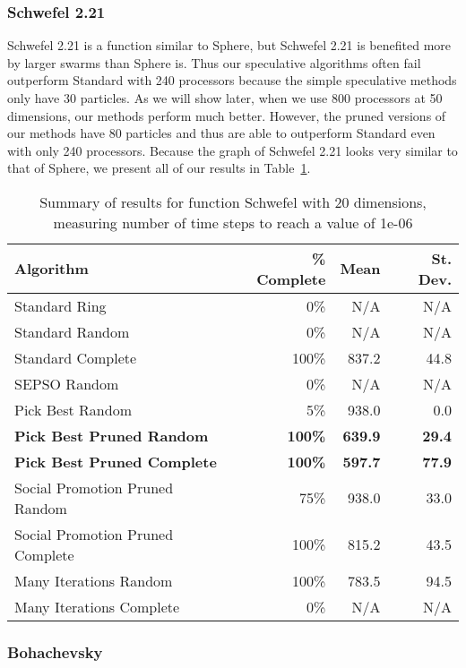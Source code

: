 \documentclass[smallcondensed]{svjour3}
\newcommand{\tabref}[1]{Table~\ref{tab:#1}}
\begin{document}
\subsubsection{Schwefel 2.21}

Schwefel 2.21 is a function similar to Sphere, but Schwefel 2.21 is benefited
more by larger swarms than Sphere is.  Thus our speculative algorithms often
fail outperform Standard with 240 processors because the simple speculative
methods only have 30 particles.  As we will show later, when we use 800
processors at 50 dimensions, our methods perform much better.  However, the
pruned versions of our methods have 80 particles and thus are able to
outperform Standard even with only 240 processors.  Because the graph of
Schwefel 2.21 looks very similar to that of Sphere, we present all of our
results in \tabref{schwefel-20}.

\begin{table}
  \caption{Summary of results for function Schwefel with 20 dimensions,
  measuring number of time steps to reach a value of 1e-06}
  \label{tab:schwefel-20}
  \centering
  \begin{tabular}{|l|r|r|r|}
  \hline
  Algorithm&\% Complete&Mean&St. Dev.\\
  \hline
  \hline
  Standard Ring&0\%&N/A&N/A\\
  \hline
  Standard Random&0\%&N/A&N/A\\
  \hline
  Standard Complete&100\%&837.2&44.8\\
  \hline
  SEPSO Random&0\%&N/A&N/A\\
  \hline
  Pick Best Random&5\%&938.0&0.0\\
  \hline
  \textbf{Pick Best Pruned Random}&\textbf{100\%}&\textbf{639.9}&\textbf{29.4}\\
  \hline
  \textbf{Pick Best Pruned Complete}&\textbf{100\%}&\textbf{597.7}&
	\textbf{77.9}\\
  \hline
  Social Promotion Pruned Random&75\%&938.0&33.0\\
  \hline
  Social Promotion Pruned Complete&100\%&815.2&43.5\\
  \hline
  Many Iterations Random&100\%&783.5&94.5\\
  \hline
  Many Iterations Complete&0\%&N/A&N/A\\
  \hline
  \end{tabular}
\end{table}


\subsubsection{Bohachevsky}
\end{document}
